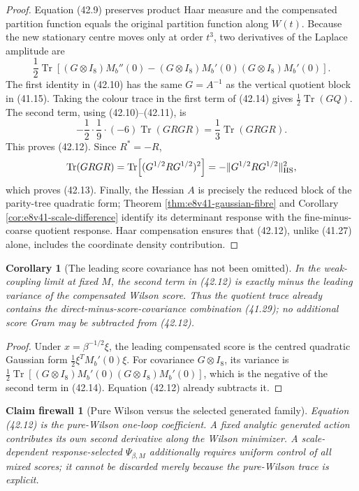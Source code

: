 \documentclass[11pt,oneside]{book}
\newtheorem{corollary}[theorem]{Corollary}
\newtheorem{firewall}[theorem]{Claim firewall}
\theoremstyle{definition}
\theoremstyle{remark}
\newcommand{\Tr}{\operatorname{Tr}}
\begin{document}
\begin{proof}
Equation (42.9) preserves product Haar measure and the compensated
partition function equals the original partition function along
\(W(t)\).  Because the new stationary centre moves only at order
\(t^3\), two derivatives of the Laplace amplitude are
\[
 \frac12\Tr\left[
 (G\otimes I_8)M_b''(0)
 -(G\otimes I_8)M_b'(0)
  (G\otimes I_8)M_b'(0)\right].                                \tag{42.14}
\]
The first identity in (42.10) has the same \(G=A^{-1}\) as the
vertical quotient block in (41.15).  Taking the colour trace in the
first term of (42.14) gives \(\frac12\Tr(GQ)\).  The second term,
using (42.10)--(42.11), is
\[
 -\frac12\cdot\frac19\cdot(-6)\Tr(GRGR)
 =\frac13\Tr(GRGR).
\]
This proves (42.12).  Since \(R^*=-R\),
\[
 \Tr(GRGR)
 =\Tr\!\left[(G^{1/2}RG^{1/2})^2\right]
 =-\|G^{1/2}RG^{1/2}\|_{\rm HS}^2,
\]
which proves (42.13).  Finally, the Hessian \(A\) is precisely the
reduced block of the parity-tree quadratic form; Theorem
\ref{thm:e8v41-gaussian-fibre} and Corollary
\ref{cor:e8v41-scale-difference} identify its determinant response
with the fine-minus-coarse quotient response.  Haar compensation
ensures that (42.12), unlike (41.27) alone, includes the coordinate
density contribution.
\end{proof}

\begin{corollary}[The leading score covariance has not been omitted]
\label{cor:e8v42-score-included}
In the weak-coupling limit at fixed \(M\), the second term in
(42.12) is exactly minus the leading variance of the compensated
Wilson score.  Thus the quotient trace already contains the
direct-minus-score-covariance combination (41.29); no additional
score Gram may be subtracted from (42.12).
\end{corollary}

\begin{proof}
Under \(x=\beta^{-1/2}\xi\), the leading compensated score is the
centred quadratic Gaussian form
\(\frac12\xi^TM_b'(0)\xi\).  For covariance \(G\otimes I_8\), its
variance is
\(\frac12\Tr[(G\otimes I_8)M_b'(0)
(G\otimes I_8)M_b'(0)]\), which is the negative of the second term
in (42.14).  Equation (42.12) already subtracts it.
\end{proof}

\begin{firewall}[Pure Wilson versus the selected generated family]
\label{fire:e8v42-pure-generated}
Equation (42.12) is the pure-Wilson one-loop coefficient.  A fixed
analytic generated action contributes its own second derivative
along the Wilson minimizer.  A scale-dependent response-selected
\(\Psi_{\beta,M}\) additionally requires uniform control of all
mixed scores; it cannot be discarded merely because the pure-Wilson
trace is explicit.
\end{firewall}
\end{document}
